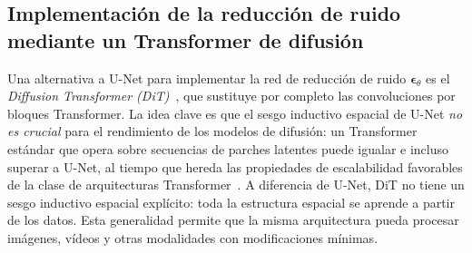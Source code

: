 \documentclass[../../book-main_es.tex]{subfiles}
\begin{document}





\subsection{Implementación de la reducción de ruido mediante un Transformer de difusión}
\label{sec:DiT-implement}

Una alternativa a U-Net para implementar la red de reducción de ruido 
$\boldsymbol{\epsilon}_\theta$ es el \textit{Diffusion Transformer (DiT)}~\citep{peebles2023scalable}, 
que sustituye por completo las convoluciones por bloques Transformer. La idea clave es que 
el sesgo inductivo espacial de U-Net \emph{no es crucial} para el rendimiento de los modelos de 
difusión: un Transformer estándar que opera sobre secuencias de parches latentes puede igualar e 
incluso superar a U-Net, al tiempo que hereda las propiedades de escalabilidad favorables de la 
clase de arquitecturas Transformer~\citep{vaswani2017attention}. A diferencia de U-Net, DiT no 
tiene un sesgo inductivo espacial explícito: toda la estructura espacial se aprende a partir de los 
datos. Esta generalidad permite que la misma arquitectura pueda procesar imágenes, vídeos y otras 
modalidades con modificaciones mínimas.
\end{document}
